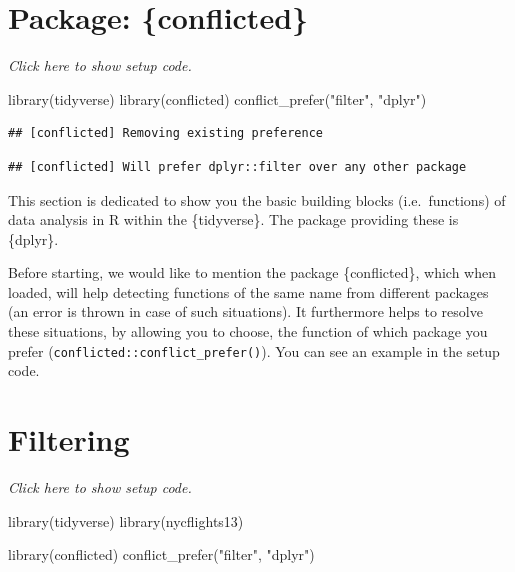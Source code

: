 \documentclass[]{book}
\newenvironment{Shaded}{}{}
\newcommand{\KeywordTok}[1]{\textcolor[rgb]{0.00,0.00,1.00}{#1}}
\newcommand{\NormalTok}[1]{#1}
\newcommand{\StringTok}[1]{\textcolor[rgb]{0.00,0.50,0.50}{#1}}
\begin{document}
\hypertarget{package-conflicted}{%
\section{Package: \{conflicted\}}\label{package-conflicted}}

\emph{Click here to show setup code.}

\begin{Shaded}
\begin{Highlighting}[]
\KeywordTok{library}\NormalTok{(tidyverse)}
\KeywordTok{library}\NormalTok{(conflicted)}
\KeywordTok{conflict_prefer}\NormalTok{(}\StringTok{"filter"}\NormalTok{, }\StringTok{"dplyr"}\NormalTok{)}
\end{Highlighting}
\end{Shaded}

\begin{verbatim}
## [conflicted] Removing existing preference
\end{verbatim}

\begin{verbatim}
## [conflicted] Will prefer dplyr::filter over any other package
\end{verbatim}

This section is dedicated to show you the basic building blocks (i.e.~functions) of data analysis in R within the \{tidyverse\}.
The package providing these is \{dplyr\}.

Before starting, we would like to mention the package \{conflicted\}, which when loaded, will help detecting functions of the same name from different packages (an error is thrown in case of such situations).
It furthermore helps to resolve these situations, by allowing you to choose, the function of which package you prefer (\texttt{conflicted::conflict\_prefer()}).
You can see an example in the setup code.

\hypertarget{filtering}{%
\section{Filtering}\label{filtering}}

\emph{Click here to show setup code.}

\begin{Shaded}
\begin{Highlighting}[]
\KeywordTok{library}\NormalTok{(tidyverse)}
\KeywordTok{library}\NormalTok{(nycflights13)}

\KeywordTok{library}\NormalTok{(conflicted)}
\KeywordTok{conflict_prefer}\NormalTok{(}\StringTok{"filter"}\NormalTok{, }\StringTok{"dplyr"}\NormalTok{)}
\end{Highlighting}
\end{Shaded}
\end{document}
